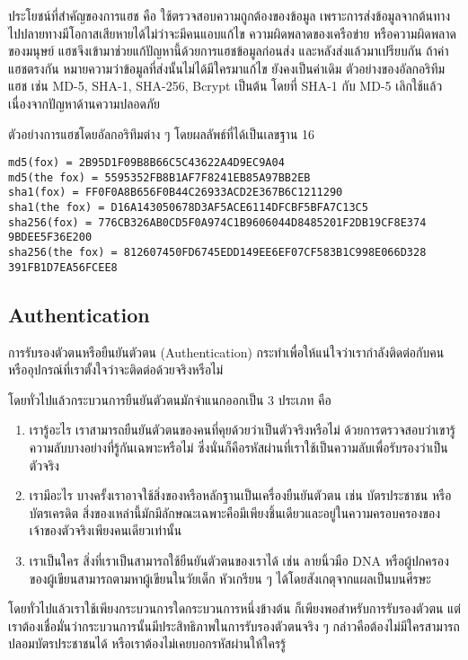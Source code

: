 ประโยชน์ที่สำคัญของการแฮช คือ ใช้ตรวจสอบความถูกต้องของข้อมูล เพราะการส่งข้อมูลจากต้นทางไปปลายทางมีโอกาสเสียหายได้ไม่ว่าจะมีคนแอบแก้ไข ความผิดพลาดของเครือข่าย หรือความผิดพลาดของมนุษย์ แฮชจึงเข้ามาช่วยแก้ปัญหานี้ด้วยการแฮชข้อมูลก่อนส่ง และหลังส่งแล้วมาเปรียบกัน ถ้าค่าแฮชตรงกัน หมายความว่าข้อมูลที่ส่งนั้นไม่ได้มีใครมาแก้ไข ยังคงเป็นค่าเดิม ตัวอย่างของอัลกอริทึมแฮช เช่น MD-5, SHA-1, SHA-256, Bcrypt เป็นต้น โดยที่ SHA-1 กับ MD-5 เลิกใช้แล้วเนื่องจากปัญหาด้านความปลอดภัย

ตัวอย่างการแฮชโดยอัลกอริทึมต่าง ๆ โดยผลลัพธ์ที่ได้เป็นเลขฐาน 16

\begin{lstlisting}[numbers=none] 
md5(fox) = 2B95D1F09B8B66C5C43622A4D9EC9A04
md5(the fox) = 5595352FB8B1AF7F8241EB85A97BB2EB
sha1(fox) = FF0F0A8B656F0B44C26933ACD2E367B6C1211290
sha1(the fox) = D16A143050678D3AF5ACE6114DFCBF5BFA7C13C5
sha256(fox) = 776CB326AB0CD5F0A974C1B9606044D8485201F2DB19CF8E374
9BDEE5F36E200
sha256(the fox) = 812607450FD6745EDD149EE6EF07CF583B1C998E066D328
391FB1D7EA56FCEE8
\end{lstlisting}

\subsection{Authentication}

การรับรองตัวตนหรือยืนยันตัวตน (Authentication) กระทำเพื่อให้แน่ใจว่าเรากำลังติดต่อกับคนหรืออุปกรณ์ที่เราตั้งใจว่าจะติดต่อด้วยจริงหรือไม่

โดยทั่วไปแล้วกระบวนการยืนยันตัวตนมักจำแนกออกเป็น 3 ประเภท คือ

\begin{enumerate}
	\itemsep0em 
	\item เรารู้อะไร เราสามารถยืนยันตัวตนของคนที่คุยด้วยว่าเป็นตัวจริงหรือไม่ ด้วยการตรวจสอบว่าเขารู้ความลับบางอย่างที่รู้กันเฉพาะหรือไม่ ซึ่งนั่นก็คือรหัสผ่านที่เราใช้เป็นความลับเพื่อรับรองว่าเป็นตัวจริง 
	\item เรามีอะไร บางครั้งเราอาจใช้สิ่งของหรือหลักฐานเป็นเครื่องยืนยันตัวตน เช่น บัตรประชาชน หรือบัตรเครดิต สิ่งของเหล่านี้มักมีลักษณะเฉพาะคือมีเพียงชิ้นเดียวและอยู่ในความครอบครองของเจ้าของตัวจริงเพียงคนเดียวเท่านั้น
	\item เราเป็นใคร สิ่งที่เราเป็นสามารถใช้ยืนยันตัวตนของเราได้ เช่น ลายนิ้วมือ DNA หรือผู้ปกครองของผู้เขียนสามารถตามหาผู้เขียนในวัยเด็ก หัวเกรียน ๆ ได้โดยสังเกตุจากแผลเป็นบนศีรษะ
\end{enumerate}

โดยทั่วไปแล้วเราใช้เพียงกระบวนการใดกระบวนการหนึ่งข้างต้น ก็เพียงพอสำหรับการรับรองตัวตน แต่เราต้องเชื่อมั่นว่ากระบวนการนั้นมีประสิทธิภาพในการรับรองตัวตนจริง ๆ กล่าวคือต้องไม่มีใครสามารถปลอมบัตรประชาชนได้ หรือเราต้องไม่เคยบอกรหัสผ่านให้ใครรู้

